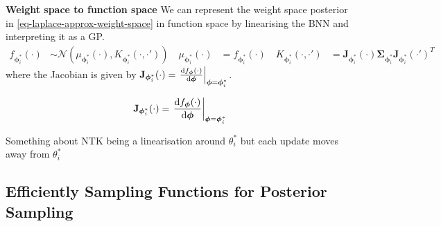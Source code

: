 \documentclass{article}
\newcommand{\transitionFn}{\ensuremath{f}}
\newcommand{\transitionParams}{\ensuremath{\bm\phi}}
\newcommand{\transitionFnWithParams}{\ensuremath{\transitionFn_{\transitionParams}}}
\begin{document}
\textbf{Weight space to function space}
We can represent the weight space posterior in \cref{eq-laplace-approx-weight-space} in
function space by linearising the BNN and interpreting it as a GP.
\begin{align} \label{eq-laplace-approx-function-space}
  \transitionFn_{\transitionParams_{i}^{*}}(\cdot) &\sim \mathcal{N} \left( \mu_{\transitionParams_{i}^{*}}(\cdot), K_{\transitionParams_{i}^{*}}(\cdot, \cdot') \right) \quad
  \mu_{\transitionParams_{i}^{*}}(\cdot) &= \transitionFn_{\transitionParams^{*}_{i}}(\cdot) \quad
  K_{\transitionParams_{i}^{*}}(\cdot, \cdot') &= \mathbf{J}_{\transitionParams^{*}_{i}}(\cdot) \bm\Sigma_{\transitionParams^{*}_{i}} \mathbf{J}_{\transitionParams^{*}_{i}}(\cdot')^{T}
\end{align}
where the Jacobian is given by $\mathbf{J}_{\transitionParams^{*}_{i}}(\cdot) = \odv{\transitionFnWithParams(\cdot)}{\transitionParams}_{\transitionParams=\transitionParams_{i}^{*}}$.

\begin{align} \label{eq-laplace-approx-jacobian}
\mathbf{J}_{\transitionParams^{*}_{i}}(\cdot) = \odv{\transitionFnWithParams(\cdot)}{\transitionParams}_{\transitionParams=\transitionParams_{i}^{*}}
\end{align}


\begin{assumption} \label{assumption-ntk-linearisation}
  Something about NTK being a linearisation around $\theta^{*}_{i}$ but each update moves away from $\theta^{*}_{i}$
\end{assumption}

\cite{rossellApproximateLaplaceApproximations2021}

\subsection{Efficiently Sampling Functions for Posterior Sampling}
\cite{wilsonEfficiently2020}
\cite{wilsonPathwise2021}
\end{document}
